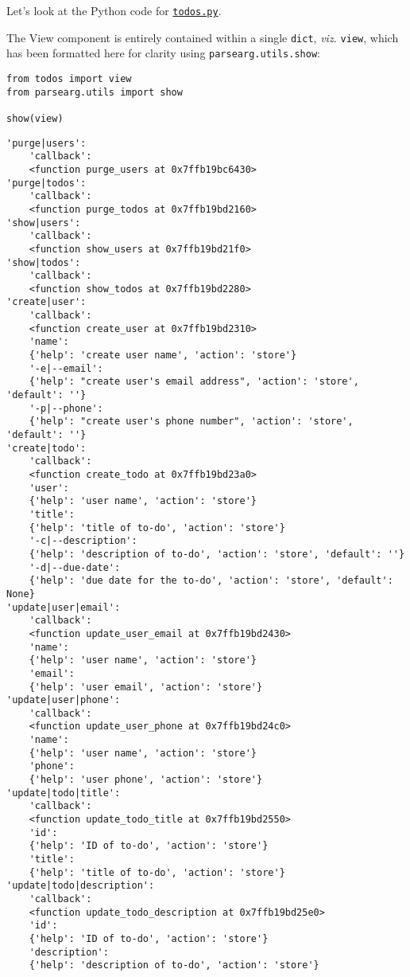 \documentclass[10pt]{amsart}
\numberwithin{equation}{section}
\begin{document}
Let's look at the Python code for \href{https://github.com/tharte/parsearg/blob/master/doc/examples/todos.py}{\texttt{todos.py}}.

The View component is entirely contained within a single \texttt{dict}, \emph{viz.} 
\texttt{view}, which has been formatted here for clarity using \texttt{parsearg.utils.show}:
\begin{verbatim}
from todos import view
from parsearg.utils import show

show(view)
\end{verbatim}

\begin{verbatim}
'purge|users':
    'callback':
    <function purge_users at 0x7ffb19bc6430>
'purge|todos':
    'callback':
    <function purge_todos at 0x7ffb19bd2160>
'show|users':
    'callback':
    <function show_users at 0x7ffb19bd21f0>
'show|todos':
    'callback':
    <function show_todos at 0x7ffb19bd2280>
'create|user':
    'callback':
    <function create_user at 0x7ffb19bd2310>
    'name':
    {'help': 'create user name', 'action': 'store'}
    '-e|--email':
    {'help': "create user's email address", 'action': 'store', 'default': ''}
    '-p|--phone':
    {'help': "create user's phone number", 'action': 'store', 'default': ''}
'create|todo':
    'callback':
    <function create_todo at 0x7ffb19bd23a0>
    'user':
    {'help': 'user name', 'action': 'store'}
    'title':
    {'help': 'title of to-do', 'action': 'store'}
    '-c|--description':
    {'help': 'description of to-do', 'action': 'store', 'default': ''}
    '-d|--due-date':
    {'help': 'due date for the to-do', 'action': 'store', 'default': None}
'update|user|email':
    'callback':
    <function update_user_email at 0x7ffb19bd2430>
    'name':
    {'help': 'user name', 'action': 'store'}
    'email':
    {'help': 'user email', 'action': 'store'}
'update|user|phone':
    'callback':
    <function update_user_phone at 0x7ffb19bd24c0>
    'name':
    {'help': 'user name', 'action': 'store'}
    'phone':
    {'help': 'user phone', 'action': 'store'}
'update|todo|title':
    'callback':
    <function update_todo_title at 0x7ffb19bd2550>
    'id':
    {'help': 'ID of to-do', 'action': 'store'}
    'title':
    {'help': 'title of to-do', 'action': 'store'}
'update|todo|description':
    'callback':
    <function update_todo_description at 0x7ffb19bd25e0>
    'id':
    {'help': 'ID of to-do', 'action': 'store'}
    'description':
    {'help': 'description of to-do', 'action': 'store'}


\end{verbatim}
\end{document}
